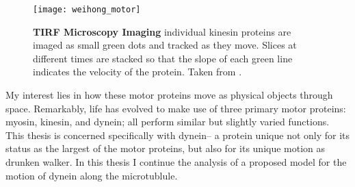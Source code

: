 \begin{figure}[!hbt]
	\centering
	\texttt{[image: weihong\_motor]}
	\caption{\textbf{TIRF Microscopy Imaging} individual kinesin proteins are imaged as small green dots and tracked as they move. Slices at different times are stacked so that the slope of each green line indicates the velocity of the protein. Taken from \cite{qiu_dynein_2012}.}
	\label{fig:weihong tirf}
\end{figure}

My interest lies in how these motor proteins move as physical objects through space. Remarkably, life has evolved to make use of three primary motor proteins: myosin, kinesin, and dynein; all perform similar but slightly varied functions. This thesis is concerned specifically with dynein-- a protein unique not only for its status as the largest of the motor proteins, but also for its unique motion as drunken walker. In this thesis I continue the analysis of a proposed model for the motion of dynein along the microtublule.   

